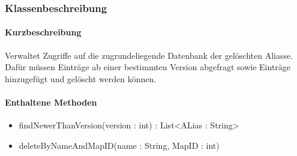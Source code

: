 \subsubsection*{Klassenbeschreibung}%
\paragraph*{Kurzbeschreibung}
Verwaltet Zugriffe auf die zugrundeliegende Datenbank der gelöschten Aliasse.
Dafür müssen Einträge ab einer bestimmten Version abgefragt sowie Einträge hinzugefügt und gelöscht werden können.
\paragraph*{Enthaltene Methoden}
\begin{itemize}
    \item findNewerThanVersion(version : int) : List<ALias : String>
    \item deleteByNameAndMapID(name : String, MapID : int)
\end{itemize}
